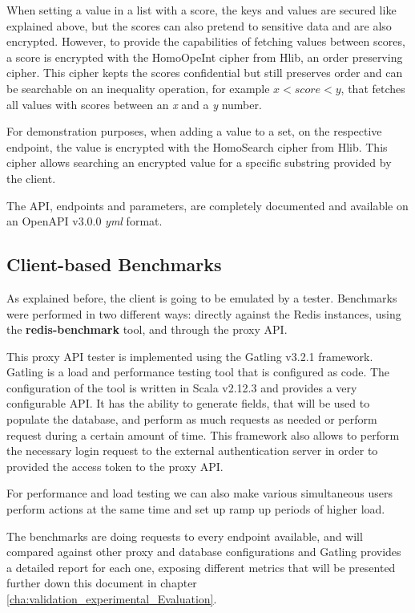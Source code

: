 When setting a value in a list with a score, the keys and values are secured like explained above, but the scores can also pretend to sensitive data and are also encrypted. However, to provide the capabilities of fetching values between scores, a score is encrypted with the HomoOpeInt cipher from Hlib, an order preserving cipher. This cipher kepts the scores confidential but still preserves order and can be searchable on an inequality operation, for example $ x < score < y $, that fetches all values with scores between an \textit{x} and a \textit{y} number.

For demonstration purposes, when adding a value to a set, on the respective endpoint, the value is encrypted with the HomoSearch cipher from Hlib. This cipher allows searching an encrypted value for a specific substring provided by the client.

The \gls{API}, endpoints and parameters, are completely documented and available on an OpenAPI v3.0.0 \textit{yml} format.

\subsection{Client-based Benchmarks}
\label{ssec:client_based_benchmarks}

As explained before, the client is going to be emulated by a tester. Benchmarks were performed in two different ways: directly against the Redis instances, using the \textbf{redis-benchmark} \cite{redis_benchmark_cli:1} tool, and through the proxy \gls{API}.

This proxy \gls{API} tester is implemented using the Gatling v3.2.1 \cite{gatling:1} framework. Gatling is a load and performance testing tool that is configured as code. The configuration of the tool is written in Scala v2.12.3 and provides a very configurable \gls{API}. It has the ability to generate fields, that will be used to populate the database, and perform as much requests as needed or perform request during  a certain amount of time. This framework also allows to perform the necessary login request to the external authentication server in order to provided the access token to the proxy API.

For performance and load testing we can also make various simultaneous users perform actions at the same time and set up ramp up periods of higher load.

The benchmarks are doing requests to every endpoint available, and will compared against other proxy and database configurations and Gatling provides a detailed report for each one, exposing different metrics that will be presented further down this document in chapter \ref{cha:validation_experimental_Evaluation}.

